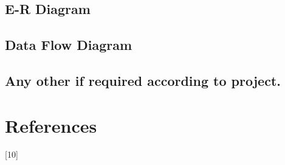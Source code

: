\documentclass{article}
\begin{document}
\subsection{E-R Diagram}

\blindtext[2]

\subsection{Data Flow Diagram}

\blindtext[2]

\subsection{Any other if required according to project.}

\blindtext[2]

\newpage
\section{References}

[10]
\end{document}
